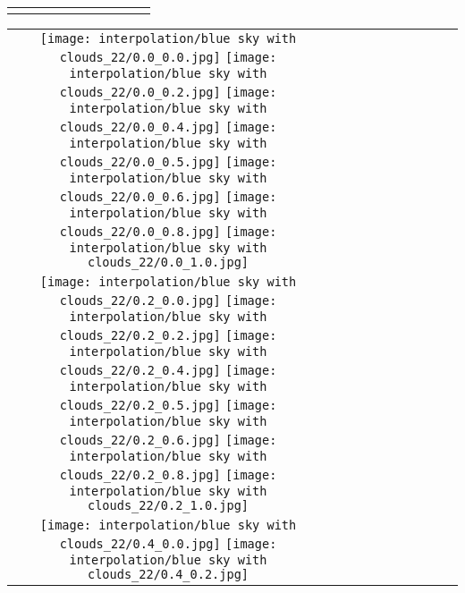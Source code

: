 \documentclass[10pt,twocolumn,letterpaper]{article}
\begin{document}
\begin{figure*}[tb!]
{\begin{tabular}{c c c c c c c c c c}
  \tabularnewline
\vspace{2mm}
\vspace{-2\baselineskip}
\end{tabular}}
\vspace{-0.8cm}
\hspace{20pt}
\label{fig:glideablation15}
\vspace{-2mm}
\end{figure*} \begin{figure*}[tb!]
    \centering
    \setlength{\tabcolsep}{0.5pt}
    {\small
    \renewcommand{\arraystretch}{0.5} 
    \begin{tabular}{c c c c c c c c c c}
    \captionsetup{type=figure, font=scriptsize}
    \raisebox{0.1in}{\rotatebox{90}{\small \emph{}
 }}
  \texttt{[image: interpolation/blue sky with clouds\_22/0.0\_0.0.jpg]}
  \texttt{[image: interpolation/blue sky with clouds\_22/0.0\_0.2.jpg]}
  \texttt{[image: interpolation/blue sky with clouds\_22/0.0\_0.4.jpg]}
  \texttt{[image: interpolation/blue sky with clouds\_22/0.0\_0.5.jpg]}
  \texttt{[image: interpolation/blue sky with clouds\_22/0.0\_0.6.jpg]}
  \texttt{[image: interpolation/blue sky with clouds\_22/0.0\_0.8.jpg]}
  \texttt{[image: interpolation/blue sky with clouds\_22/0.0\_1.0.jpg]}
 \tabularnewline
     \raisebox{0.1in}{\rotatebox{90}{\small \emph{}
 }}
  \texttt{[image: interpolation/blue sky with clouds\_22/0.2\_0.0.jpg]}
  \texttt{[image: interpolation/blue sky with clouds\_22/0.2\_0.2.jpg]}
  \texttt{[image: interpolation/blue sky with clouds\_22/0.2\_0.4.jpg]}
  \texttt{[image: interpolation/blue sky with clouds\_22/0.2\_0.5.jpg]}
  \texttt{[image: interpolation/blue sky with clouds\_22/0.2\_0.6.jpg]}
  \texttt{[image: interpolation/blue sky with clouds\_22/0.2\_0.8.jpg]}
  \texttt{[image: interpolation/blue sky with clouds\_22/0.2\_1.0.jpg]}
\tabularnewline
    \raisebox{0.1in}{\rotatebox{90}{\small \emph{}
 }}
  \texttt{[image: interpolation/blue sky with clouds\_22/0.4\_0.0.jpg]}
  \texttt{[image: interpolation/blue sky with clouds\_22/0.4\_0.2.jpg]}

\end{tabular}}
\end{figure*}
\end{document}
